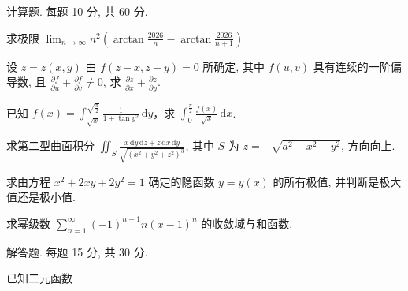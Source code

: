 \par{}
计算题. 每题 10 分, 共 60 分.\par
求极限 $\lim_{n\to \infty}n^2\left(\arctan{\frac{2026}{n}} -\arctan{\frac{2026}{n + 1}}\right)$\par
设 $z = z(x, y)$ 由 $f(z - x, z - y) = 0$ 所确定, 其中 $f(u, v)$ 具有连续的一阶偏导数, 且 $\frac{\partial f}{\partial u} + \frac{\partial f}{\partial v} \neq 0$, 求 $\frac{\partial z}{\partial x} + \frac{\partial z}{\partial y}$.\par
已知 $f(x) = \int_{\sqrt{x}}^{\sqrt{\frac{\pi}{2}}} \frac{1}{1 + \tan y^2} \, \mathrm{d}y$，求 $\int_0^{\frac{\pi}{2}} \frac{f(x)}{\sqrt{x}} \, \mathrm{d}x$.\par
求第二型曲面积分 $\iint_{S} \frac{x \, \mathrm{d}y \, \mathrm{d}z + z \, \mathrm{d}x \, \mathrm{d}y}{\sqrt{(x^2 + y^2 + z^2)^3}}$, 其中 $S$ 为 $z = -\sqrt{a^2 - x^2 - y^2}$, 方向向上.\par
求由方程 $x^{2} + 2xy + 2y^{2} = 1$ 确定的隐函数 $y = y(x)$ 的所有极值, 并判断是极大值还是极小值.\par
求幂级数 $\sum_{n=1}^{\infty} (-1)^{n-1} n(x - 1)^n$ 的收敛域与和函数.\par
\par{}
解答题. 每题 15 分, 共 30 分.\par
\par{}
已知二元函数\par
\nopagebreak[4]
